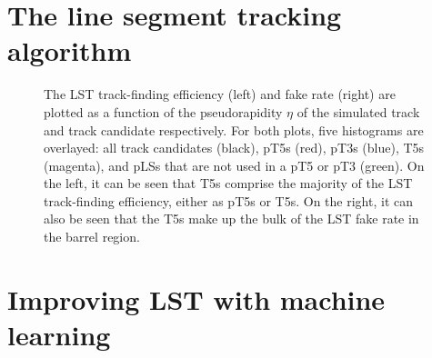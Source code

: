 \section{The line segment tracking algorithm}

\begin{figure}[!htb]
    \centering
    \qquad
    \caption{
        The LST track-finding efficiency (left) and fake rate (right) are plotted as a function of the pseudorapidity $\eta$ of the simulated track and track candidate respectively.
        For both plots, five histograms are overlayed: all track candidates (black), pT5s (red), pT3s (blue), T5s (magenta), and pLSs that are not used in a pT5 or pT3 (green).
        On the left, it can be seen that T5s comprise the majority of the LST track-finding efficiency, either as pT5s or T5s.
        On the right, it can also be seen that the T5s make up the bulk of the LST fake rate in the barrel region.
    }
    \label{fig:lst_performance}
\end{figure}

\section{Improving LST with machine learning}

